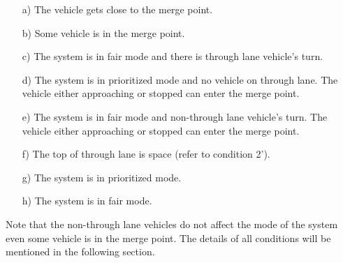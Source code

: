 \documentclass[10pt, conference, compsocconf]{IEEEtran}
\begin{document}
\begin{itemize}
  \item[a)] The vehicle gets close to the merge point. 
  \item[b)] Some vehicle is in the merge point. 
  \item[c)] The system is in fair mode and there is through lane vehicle's turn. 
  \item[d)] The system is in prioritized mode and no vehicle on through lane. The vehicle either 
  approaching or stopped can enter the merge point.
  \item[e)] The system is in fair mode and non-through lane vehicle's turn. The vehicle either 
  approaching or stopped can enter the merge point. 
  \item[f)] The top of through lane is space (refer to condition 2'). 
  \item[g)] The system is in prioritized mode.
  \item[h)] The system is in fair mode. 
\end{itemize}

Note that the non-through lane vehicles do not affect the mode of the system even
some vehicle is in the merge point.
The details of all conditions will be mentioned in the following section.

 
\end{document}
